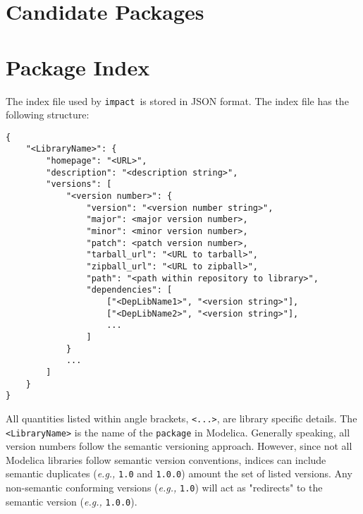 \documentclass[11pt,a4paper,twocolumn]{article}
\newcommand{\impact}{\texttt{impact}} %
\newcommand{\code}[1]{\texttt{#1}} %
\begin{document}

\section{Candidate Packages}
\label{sec:candidates}





\section{Package Index}
\label{sec:index}



The index file used by \impact\ is stored in JSON format.  The index file
has the following structure:

\begin{verbatim}
{
	"<LibraryName>": {
		"homepage": "<URL>",
		"description": "<description string>",
		"versions": [
			"<version number>": {
			    "version": "<version number string>",
				"major": <major version number>,
				"minor": <minor version number>,
				"patch": <patch version number>,
				"tarball_url": "<URL to tarball>",
				"zipball_url": "<URL to zipball>",
				"path": "<path within repository to library>",
				"dependencies": [
					["<DepLibName1>", "<version string>"],
					["<DepLibName2>", "<version string>"],
					...
				]
			}
			...
		]
	}
}
\end{verbatim}

All quantities listed within angle brackets, \code{<...>}, are library
specific details.  The \code{<LibraryName>} is the name of the \code{package} in 
Modelica.  Generally speaking, all version numbers follow the semantic versioning
approach.  However, since not all Modelica libraries follow semantic version 
conventions, indices can include semantic duplicates (\textit{e.g.,} \code{1.0} 
and \code{1.0.0}) amount the set of listed versions.  Any non-semantic conforming 
versions (\textit{e.g.,} \code{1.0}) will act as "redirects" to the semantic
version (\textit{e.g.,} \code{1.0.0}).
\end{document}
